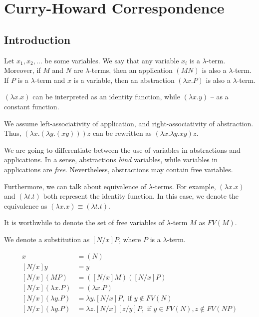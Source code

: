 \documentclass[11pt]{scrartcl}
\begin{document}
  \section{Curry-Howard Correspondence}

  \subsection{Introduction}

  \begin{definition}
    Let $x_{1}, x_{2}, \dots$ be some variables. We say that any variable
    $x_{i}$ is a $\lambda$-term. Moreover, if $M$ and $N$ are
    $\lambda$-terms, then an application $(MN)$ is also a
    $\lambda$-term. If $P$ is a $\lambda$-term and $x$ is a variable,
    then an abstraction $(\lambda x.P)$ is also a $\lambda$-term.

  \end{definition}

  \begin{note*}
    $(\lambda x.x)$ can be interpreted as an identity function, while
    $(\lambda x.y)$ -- as a constant function. 
  \end{note*}
  \begin{note*}
    We assume left-associativity of application, and
    right-associativity of abstraction. Thus,
    $(\lambda x.(\lambda y.(xy)))z$ can be rewritten
    as $(\lambda x.\lambda y.xy)z$.
  \end{note*}

  We are going to differentiate between the use of variables in
  abstractions and applications. In a sense, abstractions
  \textit{bind} variables, while variables in applications are
  \textit{free}. Nevertheless, abstractions may contain free
  variables.

  Furthermore, we can talk about equivalence of $\lambda$-terms. For
  example, $(\lambda x. x)$ and $(\lambda t.t)$ both represent the
  identity function. In this case, we denote the equivalence as
  $(\lambda x. x) \equiv (\lambda t . t)$.

  It is worthwhile to denote the set of free variables of
  $\lambda$-term $M$ as $FV(M)$.


  We denote a substitution as $[N/x]P$, where
  $P$ is a $\lambda$-term.
  

  \begin{align}
    [N / x] x &= (N)\\
    [N / x] y &= y\\
    [N / x](MP) &=  ([N/x]M)([N/x]P)\\
    [N /x](\lambda x.P) &= (\lambda x. P)\\
    [N / x](\lambda y. P) &=  \lambda y.[ N/x ]P, \text{ if $y \not \in FV(N)$}\\
    [N / x](\lambda y. P) &= \lambda z.[N / x][z / y]P, \text{ if $y \in FV(N), z \not \in FV(NP)$}
  \end{align}
\end{document}
